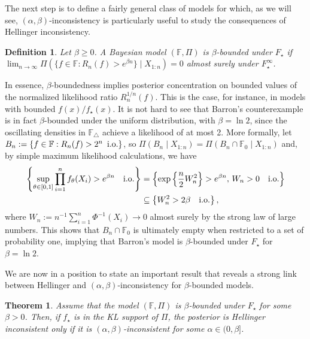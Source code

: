 \documentclass[11pt,twoside]{article}
\newtheorem{theorem}{Theorem}
\newtheorem{definition}{Definition}
\def\FF{\mathbb{F}}
\def\FF{\mathbb{F}}
\begin{document}
The next step is to define a fairly general class of models for which, as we will see, $(\alpha,\beta)$-inconsistency is particularly useful to study the consequences of Hellinger inconsistency.

\begin{definition}\label{def:beta_bounded}
    Let $\beta\geq 0$. A Bayesian model $(\FF, \Pi)$ is \emph{$\beta$-bounded under $F_\star$} if $\lim_{n\to\infty}\Pi(\{f\in\mathbb F : R_n(f)> e^{\beta n}\} \mid X_{1:n}) = 0$ almost surely under $F_\star^\infty$.
\end{definition}

In essence, $\beta$-boundedness implies posterior concentration on bounded values of the normalized likelihood ratio $R_n^{1/n}(f)$. This is the case, for instance, in models with bounded $f(x)/f_\star(x)$. It is not hard to see that Barron's counterexample is in fact $\beta$-bounded under the uniform distribution, with $\beta=\ln 2$, since the oscillating densities in $\mathbb F_\triangle$ achieve a likelihood of at most 2. More formally, let $B_n:=\{f\in\FF : R_n(f)>2^n\, \textnormal{ i.o.}\}$, so $\Pi(B_n\mid X_{1:n}) = \Pi(B_n\cap \FF_0\mid X_{1:n})$ and, by simple maximum likelihood calculations, we have
%
\begin{align*}
    \left\{\sup_{\theta\in[0,1] }\prod_{i=1}^n f_\theta(X_i)>e^{\beta n}\quad \textnormal{i.o.}\right\} &= \left\{\exp\left\{\frac{n}{2}W_n^2\right\}>e^{\beta n},\, W_n>0\quad \textnormal{i.o.}\right\} \\
    & \subseteq  \left\{W_n^2>2\beta\quad\textnormal{i.o.}\right\},
\end{align*}
%
where $W_n:=n^{-1}\sum_{i=1}^n \Phi^{-1}(X_i)\to 0$ almost surely by the strong law of large numbers. This shows that $B_n\cap \mathbb F_0$ is ultimately empty when restricted to a set of probability one, implying that Barron's model is $\beta$-bounded under $F_\star$ for $\beta=\ln2$.

We are now in a position to state an important result that reveals a strong link between Hellinger and $(\alpha,\beta)$-inconsistency for $\beta$-bounded models.


\begin{theorem}\label{thm:beta_boundedness}
    Assume that the model $(\FF, \Pi)$ is $\beta$-bounded under $F_\star$ for some $\beta>0$. Then, if $f_\star$ is in the KL support of $\Pi$, the posterior is Hellinger inconsistent only if it is $(\alpha,\beta)$-inconsistent for some $\alpha\in(0, \beta]$.
\end{theorem}
\end{document}
